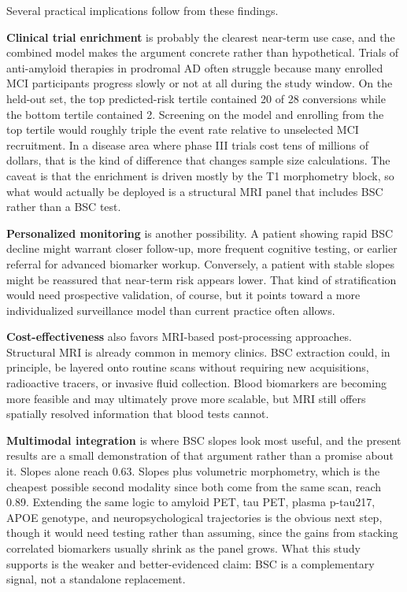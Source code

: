\documentclass[blue]{ludusofficial}  %
\begin{document}
Several practical implications follow from these findings.

\textbf{Clinical trial enrichment} is probably the clearest near-term use case, and the combined model makes the argument concrete rather than hypothetical. Trials of anti-amyloid therapies in prodromal AD often struggle because many enrolled MCI participants progress slowly or not at all during the study window. On the held-out set, the top predicted-risk tertile contained 20 of 28 conversions while the bottom tertile contained 2. Screening on the model and enrolling from the top tertile would roughly triple the event rate relative to unselected MCI recruitment. In a disease area where phase III trials cost tens of millions of dollars, that is the kind of difference that changes sample size calculations. The caveat is that the enrichment is driven mostly by the T1 morphometry block, so what would actually be deployed is a structural MRI panel that includes BSC rather than a BSC test.

\textbf{Personalized monitoring} is another possibility. A patient showing rapid BSC decline might warrant closer follow-up, more frequent cognitive testing, or earlier referral for advanced biomarker workup. Conversely, a patient with stable slopes might be reassured that near-term risk appears lower. That kind of stratification would need prospective validation, of course, but it points toward a more individualized surveillance model than current practice often allows.

\textbf{Cost-effectiveness} also favors MRI-based post-processing approaches. Structural MRI is already common in memory clinics. BSC extraction could, in principle, be layered onto routine scans without requiring new acquisitions, radioactive tracers, or invasive fluid collection. Blood biomarkers are becoming more feasible and may ultimately prove more scalable, but MRI still offers spatially resolved information that blood tests cannot.

\textbf{Multimodal integration} is where BSC slopes look most useful, and the present results are a small demonstration of that argument rather than a promise about it. Slopes alone reach 0.63. Slopes plus volumetric morphometry, which is the cheapest possible second modality since both come from the same scan, reach 0.89. Extending the same logic to amyloid PET, tau PET, plasma p-tau217, APOE genotype, and neuropsychological trajectories is the obvious next step, though it would need testing rather than assuming, since the gains from stacking correlated biomarkers usually shrink as the panel grows. What this study supports is the weaker and better-evidenced claim: BSC is a complementary signal, not a standalone replacement.
\end{document}
